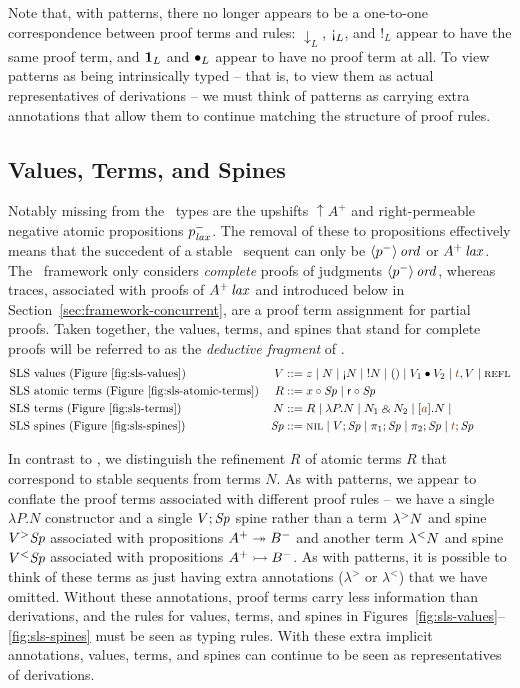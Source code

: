 Note that, with patterns, there no longer appears to be a one-to-one
correspondence between proof terms and rules: ${\downarrow}_L$,
${\gnab}_L$, and ${!}_L$ appear to have the same proof term, and
${\mathbf{1}}_L$ and ${\mathbin{\bullet}}_L$ appear to have no proof term at all. To
view patterns as being intrinsically typed -- that is, to view them as
actual representatives of derivations -- we must think of patterns as
carrying extra annotations that allow them to continue matching the
structure of proof rules.

\subsection{Values, Terms, and Spines}
\label{sec:framework-deductive}

Notably missing from the \sls~types are the upshifts ${\uparrow}A^+$
and right-permeable negative atomic propositions $p^-_{\it lax}$. The
removal of these to propositions effectively means that the succedent
of a stable \sls~sequent can only be ${\langle {p^-} \rangle}\,{{\it ord}}$ or
${A^+}\,{{\it lax}}$. The \sls~framework only considers {\it complete} proofs
of judgments ${\langle {p^-} \rangle}\,{{\it ord}}$, whereas traces, associated with
proofs of ${A^+}\,{{\it lax}}$ and introduced below in
Section~\ref{sec:framework-concurrent}, are a proof term assignment
for partial proofs. Taken together, the values, terms, and spines that
stand for complete proofs will be referred to as the {\it deductive
  fragment} of \sls.
\begin{align*}
&\mbox{\sls~values (Figure~\ref{fig:sls-values})}& 
V & ::= z
   \mid N
   \mid \tgnabr{N}
   \mid \tbangr{N}
   \mid \toner
   \mid \tfuser{V_1}{V_2}
   \mid \texistsr{\lf{t}}{V}
   \mid \tunifr
\\
&\mbox{\sls~atomic terms (Figure~\ref{fig:sls-atomic-terms})}&
R & ::= \tfocusl{x}{\Sp} 
   \mid \tfocusl{\sf r}{\Sp} 
\\
&\mbox{\sls~terms (Figure~\ref{fig:sls-terms})}&
N & ::= R
   \mid \lambda P.N 
   \mid N_1 \with N_2
   \mid \tforallr{\lf{a}}{N}
   \mid 
\\
&\mbox{\sls~spines (Figure~\ref{fig:sls-spines})}&
\Sp & ::= \tnil 
   \mid V; \Sp
   \mid \pi_1; \Sp 
   \mid \pi_2; \Sp
   \mid \lf{t}; \Sp
\end{align*}

In contrast to \ollll, we distinguish the refinement $R$ of atomic
terms $R$ that correspond to stable sequents from terms $N$. As with
patterns, we appear to conflate the proof terms associated with
different proof rules -- we have a single $\lambda P.N$ constructor
and a single $V;{\it Sp}$ spine rather than a term ${\lambda}^{>}{N}$ and spine
${V}{^{>}}{{\it Sp}}$ associated with propositions $A^+ \twoheadrightarrow B^-$ and
another term ${\lambda}^{<}{N}$ and spine ${V}{^{<}}{{\it Sp}}$ associated with
propositions $A^+ \rightarrowtail B^-$.  As with patterns, it is possible to
think of these terms as just having extra annotations ($\lambda^>$ or
$\lambda^<$) that we have omitted.  Without these annotations, proof
terms carry less information than derivations, and the rules for
values, terms, and spines in
Figures~\ref{fig:sls-values}--\ref{fig:sls-spines} must be seen as
typing rules. With these extra implicit annotations, values, terms,
and spines can continue to be seen as representatives of derivations.

